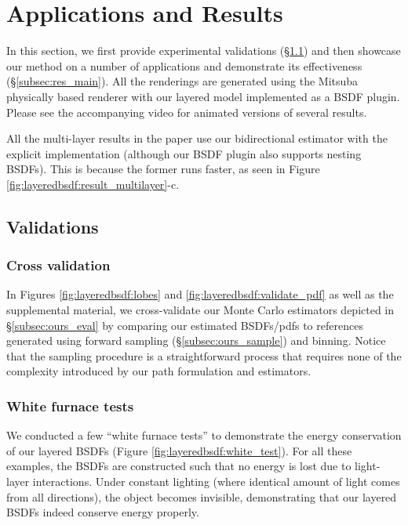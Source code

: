 \section{Applications and Results}
\label{sec:results}

In this section, we first provide experimental validations (\S\ref{subsec:res_validation}) and then showcase our method on a number of applications and demonstrate its effectiveness (\S\ref{subsec:res_main}).
All the renderings are generated using the Mitsuba physically based renderer \cite{jakob2010mitsuba} with our layered model implemented as a BSDF plugin.
Please see the accompanying video for animated versions of several results.

All the multi-layer results in the paper use our bidirectional estimator with the explicit implementation (although our BSDF plugin also supports nesting BSDFs).
This is because the former runs faster, as seen in Figure \ref{fig:layeredbsdf:result_multilayer}-c.

\subsection{Validations}
\label{subsec:res_validation}

\subsubsection{Cross validation}
In Figures \ref{fig:layeredbsdf:lobes} and \ref{fig:layeredbsdf:validate_pdf} as well as the supplemental material, we cross-validate our Monte Carlo estimators depicted in \S\ref{subsec:ours_eval} by comparing our estimated BSDFs/pdfs to references generated using forward sampling (\S\ref{subsec:ours_sample}) and binning. Notice that the sampling procedure is a straightforward process that requires none of the complexity introduced by our path formulation and estimators.

\subsubsection{White furnace tests}
We conducted a few ``white furnace tests'' to demonstrate the energy conservation of our layered BSDFs (Figure \ref{fig:layeredbsdf:white_test}).
For all these examples, the BSDFs are constructed such that no energy is lost due to light-layer interactions.
Under constant lighting (where identical amount of light comes from all directions), the object becomes invisible, demonstrating that our layered BSDFs indeed conserve energy properly.

